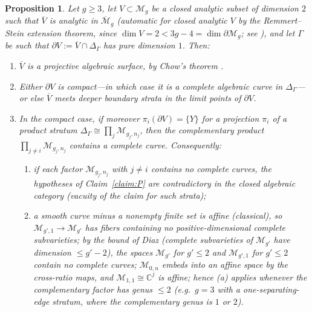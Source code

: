 \documentclass[11pt]{amsart}
\newcommand{\M}{\mathcal{M}}
\newcommand{\C}{\mathbb{C}}
\theoremstyle{plain}
\newtheorem{proposition}[theorem]{Proposition}
\theoremstyle{definition}
\theoremstyle{remark}
\begin{document}
\begin{proposition}\label{prop:complete}
Let $g\ge 3$, let $V\subset \M_g$ be a closed analytic subset of dimension $2$ such
that $\overline{V}$ is analytic in $\overline{\M}_g$ (automatic for closed analytic
$V$ by the Remmert--Stein extension theorem, since $\dim V=2<3g-4=\dim\partial\M_g$;
see \cite{Chirka, Demailly}), and let $\Gamma$ be such that
$\partial V:=\overline{V}\cap\Delta_\Gamma$ has pure dimension $1$. Then:
\begin{enumerate}
\item $\overline{V}$ is a projective algebraic surface, by Chow's theorem
\cite{Chirka, Demailly}.
\item Either $\partial V$ is compact---in which case it is a \emph{complete}
algebraic curve in $\Delta_\Gamma$---or else $\overline{V}$ meets deeper boundary
strata in the limit points of $\partial V$.
\item In the compact case, if moreover $\pi_i(\partial V)=\{Y\}$ for a projection
$\pi_i$ of a product stratum $\Delta_\Gamma\cong\prod_j \M_{g_j,n_j}$, then the
complementary product $\prod_{j\neq i}\M_{g_j,n_j}$ contains a complete curve.
Consequently:
\begin{enumerate}
\item[(a)] if each factor $\M_{g_j,n_j}$ with $j\ne i$ contains no complete curves,
the hypotheses of Claim~\ref{claim:P} are contradictory in the closed algebraic
category (vacuity of the claim for such strata);
\item[(b)] a smooth curve minus a nonempty finite set is affine (classical), so
$\M_{g',1}\to\M_{g'}$ has fibers containing no positive-dimensional complete
subvarieties; by the bound of Diaz \cite{Diaz} (complete subvarieties of $\M_{g'}$
have dimension $\le g'-2$), the spaces $\M_{g'}$ for $g'\le 2$ and $\M_{g',1}$ for
$g'\le2$ contain no complete curves; $\M_{0,n}$ embeds into an affine space by the
cross-ratio maps, and $\M_{1,1}\cong \C^j$ is affine; hence (a) applies whenever the
complementary factor has genus $\le 2$ (e.g.\ $g=3$ with a one-separating-edge
stratum, where the complementary genus is $1$ or $2$).
\end{enumerate}
\end{enumerate}
\end{proposition}
\end{document}
